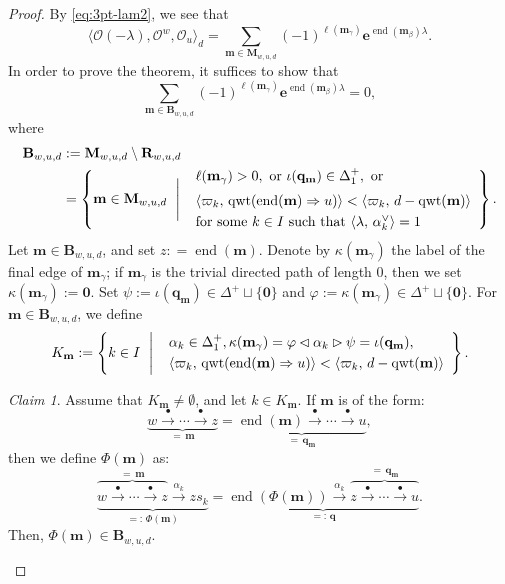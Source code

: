\documentclass[11pt,a4paper,reqno,dvipdfmx]{amsart}
\numberwithin{equation}{section}
\newcommand{\CO}{\mathcal{O}}
\newcommand{\vp}{\varphi}
\newcommand{\vpi}{\varpi}
\newcommand{\be}{\mathbf{e}}
\newcommand{\bm}{\mathbf{m}}
\newcommand{\bq}{\mathbf{q}}
\newcommand{\bB}{\mathbf{B}}
\newcommand{\bM}{\mathbf{M}}
\newcommand{\bzero}{\mathbf{0}}
\DeclareMathOperator{\qwt}{qwt}
\DeclareMathOperator{\ed}{end}
\newcommand{\edge}[1]{ \xrightarrow{\hspace{2pt}#1\hspace{2pt}} }
\newcommand{\pair}[2]{\langle #1,\,#2 \rangle}
\newcommand{\bfR}{\mathbf{R}}
\theoremstyle{plain}
\theoremstyle{definition}
\theoremstyle{remark}
\newtheorem{claim}{Claim}[lem]
\begin{document}
\begin{proof}
By \eqref{eq:3pt-lam2}, we see that 
%
\begin{equation}
\langle \CO(- \lambda),\CO^{w},\CO_{u} \rangle_{d} = 
\sum_{ \bm \in \bM_{w,u,d} }(-1)^{\ell(\bm_{\gamma})} \be^{\ed(\bm_{\beta})\lambda}. 
\end{equation}
%
In order to prove the theorem, it suffices to show that 
%
\begin{equation}
\sum_{ \bm \in \bB_{w,u,d} }(-1)^{\ell(\bm_{\gamma})} \be^{\ed(\bm_{\beta})\lambda} = 0,
\end{equation}
%
where 
%
\begin{align}
\bB_{w,u,d} & := \bM_{w,u,d} \setminus \bfR_{w,u,d} \nonumber \\
%
& = \left\{ \bm \in \bM_{w,u,d} \ \Biggm| \ 
\begin{array}{l}
\ell( \bm_{\gamma}) > 0, \text{ or } \iota(\bq_{\bm}) \in \Delta_{1}^{+}, \text{ or }\\[2mm] 
\pair{\vpi_{k}}{\qwt(\ed(\bm) \Rightarrow u)} < \pair{\vpi_{k}}{d - \qwt(\bm)} \\[1mm]
\text{for some $k \in I$ such that $\pair{\lambda}{\alpha_{k}^{\vee}} = 1$}
\end{array} \right\}. 
\end{align}
%
Let $\bm \in \bB_{w,u,d}$, and set $z : = \ed(\bm)$. 
Denote by $\kappa(\bm_{\gamma})$ the label of the final edge of $\bm_{\gamma}$; 
if $\bm_{\gamma}$ is the trivial directed path of length $0$, 
then we set $\kappa(\bm_{\gamma}):=\bzero$.
Set $\psi:=\iota(\bq_{\bm}) \in \Delta^{+} \sqcup \{\bzero\}$ and 
$\vp:=\kappa(\bm_{\gamma})  \in \Delta^{+} \sqcup \{\bzero\}$. 
For $\bm \in \bB_{w,u,d}$, we define 
%
\begin{equation*}
K_{\bm}:=\left\{ k \in I \ \Biggm| \ 
 \begin{array}{l}
 \alpha_{k} \in \Delta_{1}^{+}, 
 \kappa(\bm_{\gamma})=\vp \lhd \alpha_{k} \rhd \psi = \iota(\bq_{\bm}), \\[1mm]
 \pair{\vpi_{k}}{\qwt(\ed(\bm) \Rightarrow u)} < \pair{\vpi_{k}}{d - \qwt(\bm)}
 \end{array} \right\}. 
\end{equation*}
%
%
\begin{claim} \label{c:3pta}
Assume that $K_{\bm} \ne \emptyset$,  and let $k \in K_{\bm}$. 
If $\bm$ is of the form: 
%
\begin{equation*}
\underbrace{w \edge{\bullet} \cdots \edge{\bullet} z}_{= \, \bm} = 
\underbrace{\ed(\bm) \edge{\bullet} \cdots \edge{\bullet} u}_{= \, \bq_{\bm}}, 
\end{equation*}
%
then we define $\Phi(\bm)$ as: 
%
\begin{equation*}
\underbrace{\overbrace{ w \edge{\bullet} \cdots \edge{\bullet} z}^{= \, \bm} 
\edge{\alpha_{k}} zs_{k}}_{=: \, \Phi(\bm)} = 
\underbrace{\ed(\Phi(\bm)) \edge{\alpha_{k}} 
 \overbrace{z \edge{\bullet} \cdots \edge{\bullet} u}^{= \, \bq_{\bm}} }_{=: \, \bq}. 
\end{equation*}
%
Then, $\Phi(\bm) \in \bB_{w,u,d}$. 
\end{claim}


\end{proof}
\end{document}
